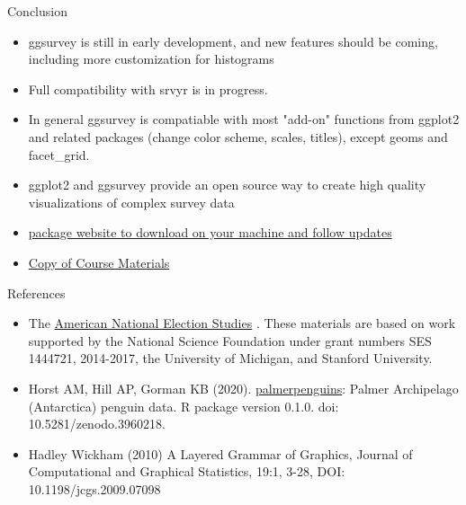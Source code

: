 \documentclass{beamer}\usepackage[]{graphicx}\usepackage[]{xcolor}
\begin{document}
\begin{frame}{Conclusion}
\begin{itemize}
\item ggsurvey is still in early development, and new features should be coming, including more customization for histograms
\item Full compatibility with srvyr is in progress.
\item In general ggsurvey is compatiable with most "add-on" functions from ggplot2 and related packages  (change color scheme, scales, titles), except geoms and facet\_grid.
\item ggplot2 and ggsurvey provide an open source way to create high quality visualizations of complex survey data
\item \href{https://github.com/balexanderstats/ggsurvey}{package website to download on your machine and follow updates}
\item \href{https://github.com/balexanderstats/ggsurveyAAPOR}{Copy of Course Materials}

\end{itemize}
\end{frame}

\begin{frame}{References}
\begin{itemize}
\item The \href{https://electionstudies.org/}{American National Election Studies} . These materials are based on work supported by the National Science Foundation under grant numbers SES 1444721, 2014-2017, the University of Michigan, and Stanford University.
\item Horst AM, Hill AP, Gorman KB (2020). \href{https://allisonhorst.github.io/palmerpenguins/}{palmerpenguins}: Palmer Archipelago (Antarctica) penguin data. R package version 0.1.0.
 doi:   10.5281/zenodo.3960218.
\item Hadley Wickham (2010) A Layered Grammar of Graphics, Journal of Computational and Graphical Statistics, 19:1, 3-28, DOI: 10.1198/jcgs.2009.07098

\end{itemize}
\end{frame}
\end{document}
